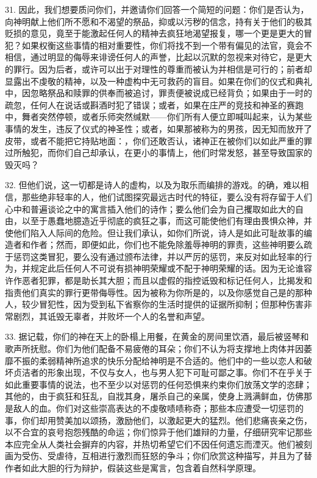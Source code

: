 31. 因此，我们想要质问你们，并邀请你们回答一个简短的问题：你们是否认为，向神明献上他们所不愿和不渴望的祭品，抑或以污秽的信念，持有关于他们的极其贬损的意见，竟至于能激起任何人的精神去疯狂地渴望报复，哪一个更是更大的冒犯？如果权衡这些事情的相对重要性，你们将找不到一个带有偏见的法官，竟会不相信，通过明显的侮辱来诽谤任何人的声誉，比起以沉默的忽视来对待它，是更大的罪行。因为后者，或许可以出于对理性的尊重而被认为并相信是可行的；前者却显露出不虔敬的精神，以及一种虚构中无可救药的盲目。如果在你们的仪式和典礼中，因忽略祭品和赎罪的供奉而被追讨，罪责便被说成已经背负；如果由于一时的疏忽，任何人在说话或斟酒时犯了错误；或者，如果在庄严的竞技和神圣的赛跑中，舞者突然停顿，或者乐师突然缄默——你们所有人便立即喊叫起来，认为某些事情的发生，违反了仪式的神圣性；或者，如果那被称为的男孩，因无知而放开了皮带，或者不能把它持贴地面：，你们还敢否认，诸神正在被你们以如此严重的罪过所触犯，而你们自己却承认，在更小的事情上，他们时常发怒，甚至导致国家的毁灭吗？\par

32. 但他们说，这一切都是诗人的虚构，以及为取乐而编排的游戏。的确，难以相信，那些绝非轻率的人，他们试图探究最远古时代的特征，要么没有将存留于人们心中和普遍谈论之中的寓言插入他们的诗作；要么他们会为自己攫取如此大的自由，以至于愚蠢地臆造近乎彻底的疯狂之事，而这可能使他们有理由畏惧众神，并使他们陷入人际间的危险。但让我们承认，如你们所说，诗人是如此可耻故事的编造者和作者；然而，即便如此，你们也不能免除羞辱神明的罪责，这些神明要么疏于惩罚这类冒犯，要么没有通过颁布法律，并以严厉的惩罚，来反对如此轻率的行为，并规定此后任何人不可说有损神明荣耀或不配于神明荣耀的话。因为无论谁容许作恶者犯罪，都是助长其大胆；而且以虚假的指控诋毁和标记任何人，比揭发和指责他们真实的罪行更带侮辱性。因为被称为你所是的，以及你感觉自己是的那种人，较少冒犯性，因为受到私下省察你的生活时提供的证据所抑制；但那种伤害非常剧烈，其诋毁无辜者，并败坏一个人的名誉和声望。\par

33. 据记载，你们的神在天上的卧榻上用餐，在黄金的房间里饮酒，最后被竖琴和歌声所抚慰。你们为他们配备不易疲倦的耳朵；你们不认为将支撑地上肉体并因萎靡不振的柔弱精神所追求的快乐分配给神明是不合适的。他们中的一些以恋人和破坏贞洁者的形象出现，不仅与女人，也与男人犯下可耻可鄙之事。你们不在乎关于如此重要事情的说法，也不至少以对惩罚的任何恐惧来约束你们放荡文学的恣肆；其他的，由于疯狂和狂乱，自戕其身，屠杀自己的亲属，使身上溅满鲜血，仿佛那是敌人的血。你们对这些崇高表达的不虔敬啧啧称奇；那些本应遭受一切惩罚的事，你们却用赞美加以颂扬，激励他们，以激起更大的猛烈。他们悲痛丧亲之伤，以不合宜的哀号抱怨残酷的命运；你们惊异于他们雄辩的力量，仔细研究牢记那些本应完全从人类社会摒弃的内容，并热切希望它们不因任何遗忘而湮灭。他们被刻画为受伤、受虐待，互相进行激烈而狂怒的争斗；你们欣赏这种描写，并且为了替作者如此大胆的行为辩护，假装这些是寓言，包含着自然科学原理。\par

